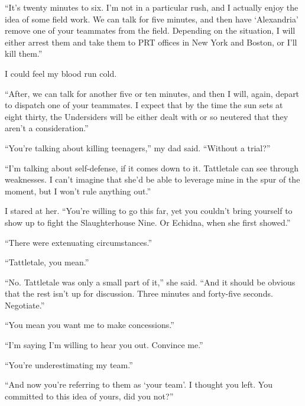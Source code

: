 ``It's twenty minutes to six.  I'm not in a particular rush, and I actually enjoy the idea of some field work.  We can talk for five minutes, and then have `Alexandria' remove one of your teammates from the field.  Depending on the situation, I will either arrest them and take them to PRT offices in New York and Boston, or I'll kill them.''



I could feel my blood run cold.



``After, we can talk for another five or ten minutes, and then I will, again, depart to dispatch one of your teammates.  I expect that by the time the sun sets at eight thirty, the Undersiders will be either dealt with or so neutered that they aren't a consideration.''



``You're talking about killing teenagers,'' my dad said.  ``Without a trial?''



``I'm talking about self-defense, if it comes down to it.  Tattletale can see through weaknesses.  I can't imagine that she'd be able to leverage mine in the spur of the moment, but I won't rule anything out.''



I stared at her.  ``You're willing to go this far, yet you couldn't bring yourself to show up to fight the Slaughterhouse Nine.  Or Echidna, when she first showed.''



``There were extenuating circumstances.''



``Tattletale, you mean.''



``No.  Tattletale was only a small part of it,'' she said.  ``And it should be obvious that the rest isn't up for discussion.  Three minutes and forty-five seconds.  Negotiate.''



``You mean you want me to make concessions.''



``I'm saying I'm willing to hear you out.  Convince me.''



``You're underestimating my team.''



``And now you're referring to them as `your team'.  I thought you left.  You committed to this idea of yours, did you not?''



